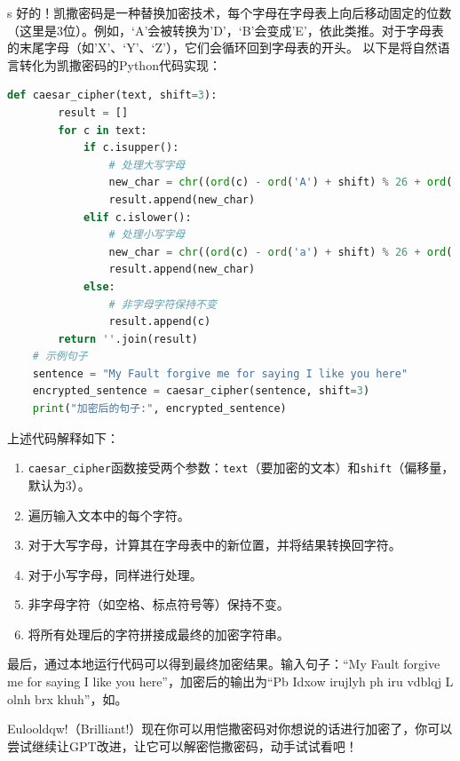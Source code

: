 \begin{gptbox}
s \footnotesize{好的！凯撒密码是一种替换加密技术，每个字母在字母表上向后移动固定的位数（这里是3位）。例如，`A'会被转换为'D'，`B'会变成'E'，依此类推。对于字母表的末尾字母（如'X'、`Y'、`Z'），它们会循环回到字母表的开头。
以下是将自然语言转化为凯撒密码的Python代码实现：
}
\small{
\begin{lstlisting}[language=Python]
    def caesar_cipher(text, shift=3):
        result = []
        for c in text:
            if c.isupper():
                # 处理大写字母
                new_char = chr((ord(c) - ord('A') + shift) % 26 + ord('A'))
                result.append(new_char)
            elif c.islower():
                # 处理小写字母
                new_char = chr((ord(c) - ord('a') + shift) % 26 + ord('a'))
                result.append(new_char)
            else:
                # 非字母字符保持不变
                result.append(c)
        return ''.join(result)
    # 示例句子
    sentence = "My Fault forgive me for saying I like you here"
    encrypted_sentence = caesar_cipher(sentence, shift=3)
    print("加密后的句子:", encrypted_sentence)
\end{lstlisting}
}
\end{gptbox}

上述代码解释如下：

\begin{enumerate}
  \def\labelenumi{\arabic{enumi}.}

  \item
        \texttt{caesar\_cipher}函数接受两个参数：\texttt{text}（要加密的文本）和\texttt{shift}（偏移量，默认为3）。
  \item
        遍历输入文本中的每个字符。
  \item
        对于大写字母，计算其在字母表中的新位置，并将结果转换回字符。
  \item
        对于小写字母，同样进行处理。
  \item
        非字母字符（如空格、标点符号等）保持不变。
  \item
        将所有处理后的字符拼接成最终的加密字符串。
\end{enumerate}

最后，通过本地运行代码可以得到最终加密结果。输入句子：``My Fault forgive me for saying I like you here''，加密后的输出为``Pb Idxow irujlyh ph iru vdblqj L olnh brx khuh''，如。


Eulooldqw!（Brilliant!）现在你可以用恺撒密码对你想说的话进行加密了，你可以尝试继续让GPT改进，让它可以解密恺撒密码，动手试试看吧！